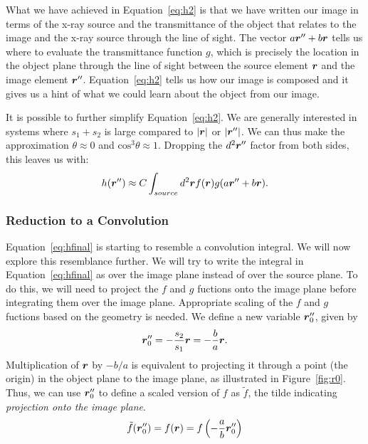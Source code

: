 \documentclass[mphy386-notes.tex]{subfiles}
\begin{document}
What we have achieved in Equation~\ref{eq:h2} is that we have written our image in terms
of the x-ray source and the transmittance of the object that relates to the image and the x-ray 
source through the line of sight.  The vector $a\boldsymbol{r}'' + b\boldsymbol{r}$ tells us where to evaluate
the transmittance function $g$, which is precisely the location in the object plane through the line of
sight between the source element $\boldsymbol{r}$ and the image element $\boldsymbol{r}''$.  Equation~\ref{eq:h2} tells 
us how our image is composed and it gives us a hint of what we could learn about the object from our image.

It is possible to further simplify Equation~\ref{eq:h2}.  We are generally interested in 
systems where $s_1 + s_2$ is large compared to $|\boldsymbol{r}|$ or $|\boldsymbol{r}''|$. We
can thus make the approximation $\theta \approx 0$ and $\text{cos}^3\theta \approx 1$. Dropping the
$d^2\boldsymbol{r}''$ factor from both sides, this leaves us with:
\begin{align}
  h(\boldsymbol{r}'') \approx C\int_{source}d^2 \boldsymbol{r} f(\boldsymbol{r})g(a\boldsymbol{r}'' + b\boldsymbol{r}).
  \label{eq:hfinal}
\end{align}

\subsubsection{Reduction to a Convolution}

Equation~\ref{eq:hfinal} is starting to resemble a convolution integral. We will now explore this
resemblance further.  We will try to write the integral in Equation~\ref{eq:hfinal} as over the image
plane instead of over the source plane.  To do this, we will need to project the $f$ and $g$ fuctions
onto the image plane before integrating them over the image plane.  Appropriate scaling of the 
$f$ and $g$ fuctions based on the geometry is needed.  We define a new variable $\boldsymbol{r}_0''$, given by
\begin{align}
  \boldsymbol{r}_0'' = -\frac{s_2}{s_1}\boldsymbol{r} = -\frac{b}{a}\boldsymbol{r}.
\end{align}
Multiplication of $\boldsymbol{r}$ by $-b/a$ is equivalent to projecting it through a
point (the origin) in the object plane to the image plane, as illustrated in Figure~\ref{fig:r0}.  Thus,
we can use $\boldsymbol{r}_0''$ to define a scaled version of $f$ as $\tilde{f}$, the tilde indicating 
\textit{projection onto the image plane}.
\begin{align}
  \tilde{f}(\boldsymbol{r}_0'') &= f(\boldsymbol{r}) = f\left(-\frac{a}{b}\boldsymbol{r}_0''\right)\\
\end{align}
\end{document}
